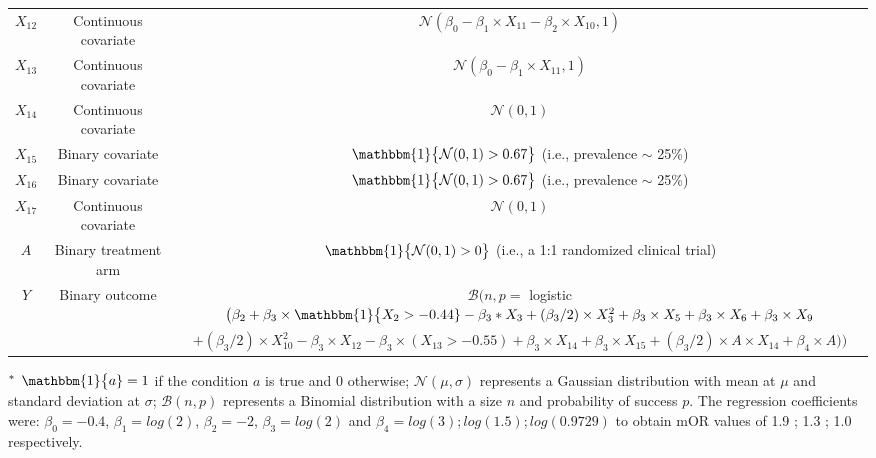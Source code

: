 \documentclass{article}
\begin{document}
\begin{center}
\begin{table}[!ht]
\begin{tabular*}{\textwidth}{@{\extracolsep\fill}ccc@{}}
$X_{12}$ & Continuous  covariate &  $\mathcal{N} (\beta_0  - \beta_1  \times X_{11} -  \beta_2  \times X_{10} , 1)$ \\
$X_{13}$ & Continuous  covariate   &  $\mathcal{N} (\beta_0 - \beta_1 \times X_{11}, 1)$ \\
$X_{14}$ & Continuous  covariate   &    $\mathcal{N} (0,1)$ \\
$X_{15}$ & Binary  covariate   & $\mathbbm{1} \big \{ \mathcal{N} (0,1)> 0.67 \big \}$ (i.e., prevalence $\sim$ 25\%)  \\
$X_{16}$ & Binary  covariate &  $\mathbbm{1} \big \{ \mathcal{N} (0,1)> 0.67 \big \}$  (i.e., prevalence $\sim$ 25\%)  \\
$X_{17}$ & Continuous  covariate   &    $\mathcal{N} (0,1)$    \\ \hline
$A$ & Binary treatment arm   &   $\mathbbm{1} \big \{ \mathcal{N} (0,1)> 0 \big \}$  (i.e., a 1:1 randomized clinical trial)   \\ \hline
\multirow{2}{*}{$Y$} & \multirow{2}{*}{Binary  outcome} &   $\mathcal{B} \big ( n, p = $ logistic$ \big(  \beta_2 + \beta_3  \times \mathbbm{1} \big \{ X_{2} > -0.44  \}  -   \beta_3  * X_3 + ( \beta_3 / 2) \times X_3^2  + \beta_3 \times X_5 +  \beta_3 \times X_6 +  \beta_3 \times X_9$ \\
&  &  $ +   (\beta_3/2) \times X_{10}^2 -   \beta_3 \times X_{12} -  \beta_3 \times (X_{13} > -0.55) +  \beta_3 \times X_{14} +   \beta_3 \times X_{15} +   (\beta_3/2) \times  A \times X_{14} +   \beta_4 \times A    \big )  \big )$      \\ 
\bottomrule
\end{tabular*}
\begin{tablenotes}%
\item[$^{\rm *}$] $\mathbbm{1} \big \{  a \} = 1$ if the condition $a$ is true and 0 otherwise;  $\mathcal{N} (\mu,\sigma)$ represents a Gaussian distribution with mean at $\mu$ and standard deviation at $\sigma$; $\mathcal{B} (n,p)$ represents a Binomial distribution with a size $n$ and probability of success  $p$.  The regression coefficients were: $\beta_0 = -0.4 $,   $\beta_1 = log(2)$,  $\beta_2 = -2$,  $\beta_3 = log(2)$ and $\beta_4 = log(3) ; log(1.5) ; log(0.9729)$ to obtain mOR values of 1.9 ; 1.3 ; 1.0 respectively.
\end{tablenotes}
\end{table}
\end{center}
\end{document}
